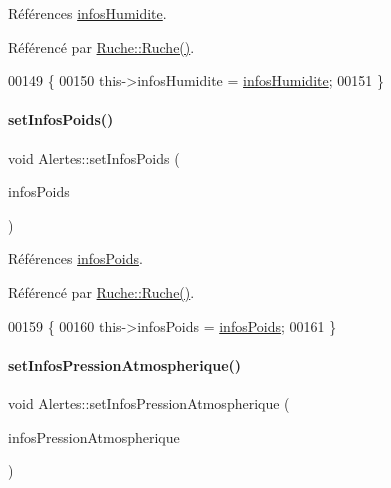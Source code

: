 Références \hyperlink{class_alertes_a7b6d798ca0629b474120cd55eb8b510c}{infos\+Humidite}.



Référencé par \hyperlink{class_ruche_a8b4ee3752d984c5acee93b990db7939a}{Ruche\+::\+Ruche()}.


\begin{DoxyCode}
00149 \{
00150     this->infosHumidite = \hyperlink{class_alertes_a7b6d798ca0629b474120cd55eb8b510c}{infosHumidite};
00151 \}
\end{DoxyCode}
\mbox{\label{class_alertes_a100bad47769994abc976419a355c4a26}} 
\paragraph{\texorpdfstring{set\+Infos\+Poids()}{setInfosPoids()}}
{\footnotesize\ttfamily void Alertes\+::set\+Infos\+Poids (\begin{DoxyParamCaption}\item[{\hyperlink{class_infos_poids}{Infos\+Poids} $\ast$}]{infos\+Poids }\end{DoxyParamCaption})}



Références \hyperlink{class_alertes_add699ea1cebadb371f86b4c47ebe381d}{infos\+Poids}.



Référencé par \hyperlink{class_ruche_a8b4ee3752d984c5acee93b990db7939a}{Ruche\+::\+Ruche()}.


\begin{DoxyCode}
00159 \{
00160     this->infosPoids = \hyperlink{class_alertes_add699ea1cebadb371f86b4c47ebe381d}{infosPoids};
00161 \}
\end{DoxyCode}
\mbox{\label{class_alertes_a771133f26d4ab8c90d1bdf50e1d23d87}} 
\paragraph{\texorpdfstring{set\+Infos\+Pression\+Atmospherique()}{setInfosPressionAtmospherique()}}
{\footnotesize\ttfamily void Alertes\+::set\+Infos\+Pression\+Atmospherique (\begin{DoxyParamCaption}\item[{\hyperlink{class_infos_pression_atmospherique}{Infos\+Pression\+Atmospherique} $\ast$}]{infos\+Pression\+Atmospherique }\end{DoxyParamCaption})}



